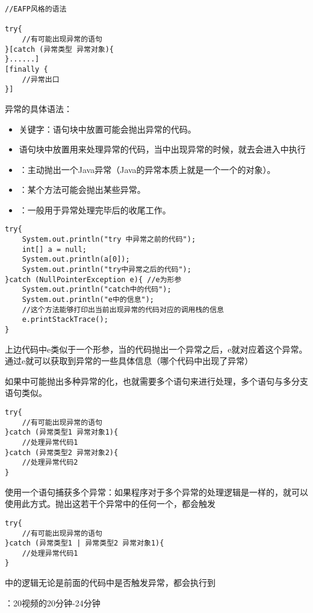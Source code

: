 \documentclass[a4paper]{report}
\begin{document}
\begin{lstlisting}
//EAFP风格的语法

try{
    //有可能出现异常的语句
}[catch (异常类型 异常对象){
}......]
[finally {
    //异常出口
}]
\end{lstlisting}
异常的具体语法：
\begin{itemize}
\itemsep=0pt \parskip =0pt
\item {}关键字：语句块中放置可能会抛出异常的代码。
\item {}语句块中放置用来处理异常的代码，当中出现异常的时候，就去会进入中执行
\item {}：主动抛出一个Java异常（Java的异常本质上就是一个一个的对象）。
\item {}：某个方法可能会抛出某些异常。
\item {}：一般用于异常处理完毕后的收尾工作。
\end{itemize}
\begin{lstlisting}
try{
    System.out.println("try 中异常之前的代码");
    int[] a = null;
    System.out.println(a[0]);
    System.out.println("try中异常之后的代码");
}catch (NullPointerException e){ //e为形参
    System.out.println("catch中的代码");
    System.out.println("e中的信息");
    //这个方法能够打印出当前出现异常的代码对应的调用栈的信息
    e.printStackTrace();
}
\end{lstlisting}
上边代码中e类似于一个形参，当的代码抛出一个异常之后，e就对应着这个异常。通过e就可以获取到异常的一些具体信息（哪个代码中出现了异常）

如果中可能抛出多种异常的化，也就需要多个语句来进行处理，多个语句与多分支语句类似。
\begin{lstlisting}
try{
    //有可能出现异常的语句
}catch (异常类型1 异常对象1){
    //处理异常代码1
}catch (异常类型2 异常对象2){
    //处理异常代码2
}
\end{lstlisting}

使用一个语句捕获多个异常：如果程序对于多个异常的处理逻辑是一样的，就可以使用此方式。抛出这若干个异常中的任何一个，都会触发
\begin{lstlisting}
try{
    //有可能出现异常的语句
}catch (异常类型1 | 异常类型2 异常对象1){
    //处理异常代码1
}
\end{lstlisting}

中的逻辑无论是前面的代码中是否触发异常，都会执行到

：20视频的20分钟-24分钟
\end{document}
